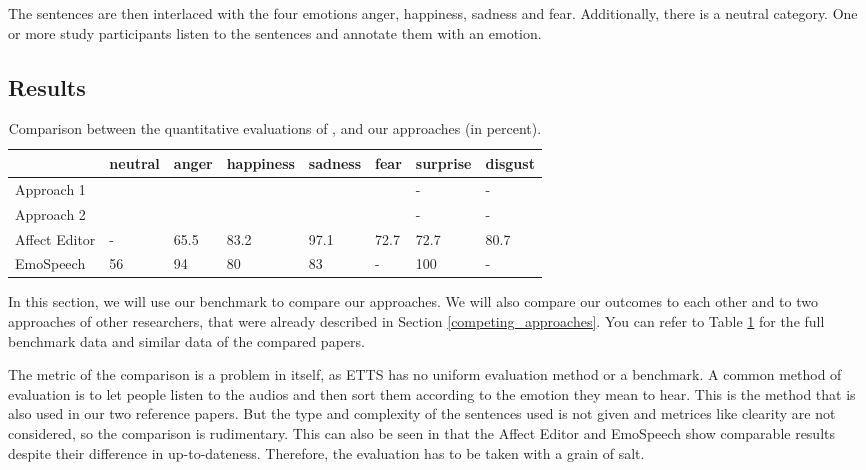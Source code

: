 \documentclass[11pt]{article}
\begin{document}
The sentences are then interlaced with the four emotions anger, happiness, sadness and fear. Additionally, there is a neutral category. One or more study participants listen to the sentences and annotate them with an emotion.


\subsection{Results}
\begin{table}[t]

\centering
\vspace{5px}
{
\begin{tabular}{|p{2cm}|p{1.5cm}|p{1.5cm}|p{1.5cm}|p{1.5cm}|p{1.5cm}|p{1.5cm}|p{1.5cm}|}
\hline
\rowcolor{mintgreen}&neutral&anger&happiness&sadness&fear&surprise&disgust\\
\hline
\cellcolor{gainsboro}Approach 1&&&&&&-&-\\
\hline
\cellcolor{gainsboro}Approach 2&&&&&&-&-\\
\hline
\hline
\cellcolor{gainsboro}Affect Editor& -&65.5&83.2&97.1&72.7&72.7&80.7\\
\hline
\cellcolor{gainsboro}EmoSpeech&56 &94&80 &83&-&100&-\\
\hline
\end{tabular}
}

\caption{Comparison between the quantitative evaluations of \cite{cahn_generation_2000}, \cite{diatlova_emospeech_2023} and our approaches (in percent).}
\label{Tabelle}
\end{table}
In this section, we will use our benchmark to compare our approaches. We will also compare our outcomes to each other and to two approaches of other researchers, that were already described in Section \ref{competing_approaches}. You can refer to Table \ref{Tabelle} for the full benchmark data and similar data of the compared papers.

The metric of the comparison is a problem in itself, as ETTS has no uniform evaluation method or a benchmark. A common method of evaluation is to let people listen to the audios and then sort them according to the emotion they mean to hear. This is the method that is also used in our two reference papers. But the type and complexity of the sentences used is not given and metrices like clearity are not considered, so the comparison is rudimentary. This can also be seen in that the Affect Editor and EmoSpeech show comparable results despite their difference in up-to-dateness. Therefore, the evaluation has to be taken with a grain of salt.
\end{document}
